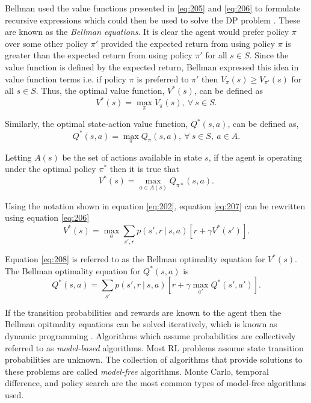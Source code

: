 Bellman used the value functions presented in \ref{eq:205} and \ref{eq:206} to formulate recursive expressions which could then be used to solve the DP problem \cite{Bellm1957}. These are known as the \textit{Bellman equations}. It is clear the agent would prefer policy $\pi$ over some other policy $\pi'$ provided the expected return from using policy $\pi$ is greater than the expected return from using policy $\pi'$ for all $s \in S$. Since the value function is defined by the expected return, Bellman expressed this idea in value function terms i.e. if policy $\pi$ is preferred to $\pi'$ then $V_{\pi}(s) \geq V_{\pi'}(s)$ for all $s \in S$. Thus, the optimal value function, $V^*(s)$, can be defined as
\begin{equation}
	V^*(s) = \max_{\pi} V_{\pi}(s), \ \forall \ s \in S.
\end{equation}

Similarly, the optimal state-action value function, $Q^*(s,a)$, can be defined as,
\begin{equation}
	Q^*(s,a) = \max_{\pi} Q_{\pi}(s,a), \ \forall \ s \in S, \ a \in A.
\end{equation}

Letting $A(s)$ be the set of actions available in state $s$, if the agent is operating under the optimal policy $\pi^*$ then it is true that
\begin{equation}
	V^*(s) = \max_{a \in A(s)} Q_{\pi*}(s,a). \label{eq:207}
\end{equation}

Using the notation shown in equation \ref{eq:202}, equation \ref{eq:207} can be rewritten using equation \ref{eq:206}
\begin{equation}
	V^*(s) = \max_{a} \sum_{s',r} p(s', r \ | \ s, a)[r + \gamma V^*(s')]. \label{eq:208}
\end{equation}  

Equation \ref{eq:208} is referred to as the Bellman optimality equation for $V^*(s)$. The Bellman optimality equation for $Q^*(s,a)$ is
\begin{equation}
	Q^*(s,a) = \sum_{s'} p(s', r \ | \ s, a)[r + \gamma \max_{a'} Q^*(s',a')].
\end{equation}

If the transition probabilities and rewards are known to the agent then the Bellman opitmality equations can be solved iteratively, which is known as dynamic programming \cite{Bellm1957}. Algorithms which assume probabilities are collectively referred to as \textit{model-based} algorithms. Most RL problems assume state transition probabilities are unknown. The collection of algorithms that provide solutions to these problems are called \textit{model-free} algorithms. Monte Carlo, temporal difference, and policy search are the most common types of model-free algorithms used.

